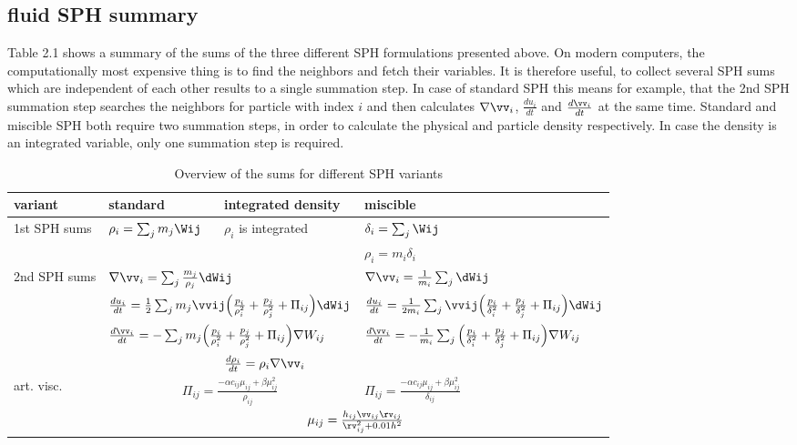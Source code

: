 \subsection{fluid SPH summary}
Table 2.1 shows a summary of the sums of the three different SPH formulations presented above. On modern computers, the computationally most expensive thing is to find the neighbors and fetch their variables. It is therefore useful, to collect several SPH sums which are independent of each other results to a single summation step. In case of standard SPH this means for example, that the 2nd SPH summation step searches the neighbors for particle with index $i$ and then calculates $\nabla \vv_i$, $ \frac{du_i}{dt} $ and $\frac{d \vv_i }{dt}$ at the same time. Standard and miscible SPH both require two summation steps, in order to calculate the physical and particle density respectively. In case the density is an integrated variable, only one summation step is required. 
\begin{table}[htdp]
\begin{center}
\begin{tabular}{|l|l|l|l|}
\hline
variant & standard & integrated density & miscible \\
\hline \hline
\multirow{2}{1.5cm}{1st SPH sums} & 
\multirow{2}{2.5cm}{$\rho_i = \sum_{j} m_j \Wij $} & 
\multirow{2}{2.0cm}{$\rho_i$ is integrated}  & 
$ \delta_i = \sum_{j} \Wij$ \\
 &
 &
 & 
$\rho_i = m_i \delta_i $ \\
\hline
\multirow{4}{1.5cm}{2nd SPH sums} &
\multicolumn{2}{|l|}{$ \nabla \vv_i = \sum_{j} \frac{m_j}{\rho_j} \dWij $} & 
$ \nabla \vv_i = \frac{1}{m_i} \sum_{j} \dWij $ \\
& 
\multicolumn{2}{|l|}{$ \frac{du_i}{dt} = \frac{1}{2} \sum_{j} m_{j} \vvij \Big( \frac{p_i}{\rho_i^2}  + \frac{p_j}{\rho_j^2} + \Pi_{ij} \Big) \dWij $} & 
$ \frac{du_i}{dt} = \frac{1}{2 m_i} \sum_{j} \vvij \Big( \frac{p_i}{\delta_i^2}  + \frac{p_j}{\delta_j^2} + \Pi_{ij} \Big)  \dWij $ \\
& 
\multicolumn{2}{|l|}{$\frac{d \vv_i }{dt} = - \sum_{j} m_j \Big( \frac{p_i}{\rho_i^2} + \frac{p_j}{\rho_j^2}  +\Pi_{ij} \Big) \nabla W_{ij}$} & 
$\frac{d \vv_i }{dt} = - \frac{1}{m_i} \sum_{j} \Big( \frac{p_i}{\delta_i^2} + \frac{p_j}{\delta_j^2} + \Pi_{ij} \Big) \nabla W_{ij}$\\
&   
& 
$\frac{d \rho_i}{dt} = \rho_i \nabla \vv_i$ & \\
\hline
art. visc. & \multicolumn{2}{|c|}{$\Pi_{ij} = \frac{- \alpha c_{ij} \mu_{ij} +  \beta \mu_{ij}^2 }{\rho_{ij} } $} & $\Pi_{ij} = \frac{- \alpha c_{ij} \mu_{ij} +  \beta \mu_{ij}^2 }{\delta_{ij} } $ \\
 & \multicolumn{3}{|c|}{$\mu_{ij} = \frac{h_{ij} \vv_{ij} \rv_{ij}}{\rv_{ij}^2+ 0.01h^2} $} \\
\hline
\end{tabular}
\caption{Overview of the sums for different SPH variants}
\end{center}
\label{ch02_sph01_tabl01}
\end{table}


